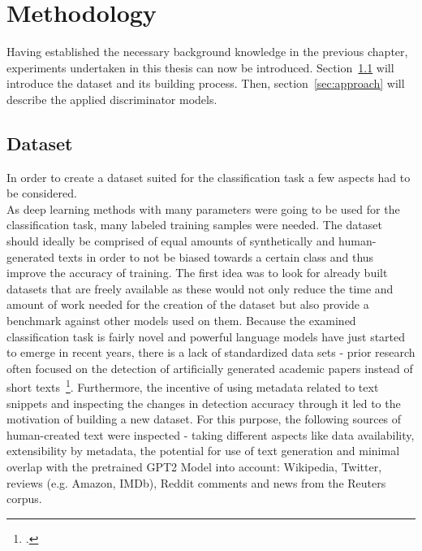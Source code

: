 \section{Methodology}
\label{ch:methodology}

Having established the necessary background knowledge in the previous chapter, experiments undertaken in this thesis can  now be introduced. Section~\ref{sec:dataset} will introduce the dataset and its building process. Then, section~\ref{sec:approach} will describe the applied discriminator models.

\subsection{Dataset}
\label{sec:dataset}

In order to create a dataset suited for the classification task a few aspects had to be considered. \\
As deep learning methods with many parameters were going to be used for the classification task, many labeled training samples were needed. The dataset should ideally be comprised of equal amounts of synthetically and human-generated texts in order to not be biased towards a certain class and thus improve the accuracy of training. The first idea was to look for already built datasets that are freely available as these would not only reduce the time and amount of work needed for the creation of the dataset but also provide a benchmark against other models used on them. Because the examined classification task is fairly novel and powerful language models have just started to emerge in recent years, there is a lack of standardized data sets - prior research often focused on the detection of artificially generated academic papers instead of short texts~\footcite{lavoie2010algorithmic}. Furthermore, the incentive of using metadata related to text snippets and inspecting the changes in detection accuracy through it led to the motivation of building a new dataset. For this purpose, the following sources of human-created text were inspected - taking different aspects like data availability, extensibility by metadata, the potential for use of text generation and minimal overlap with the pretrained GPT2 Model into account: Wikipedia, Twitter, reviews (e.g. Amazon, IMDb), Reddit comments and news from the Reuters corpus.

